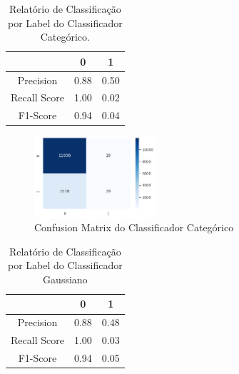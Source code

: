 \documentclass[conference]{IEEEtran}
\begin{document}
\begin{table}[H]

	\centering
    \caption{\label{tab:cr2-cnb} Relatório de Classificação por Label do Classificador Categórico.}
    \begin{small}
        \begin{tabular}{ccc}
        
            \hline
                                    & 0                & 1\\
            \hline
            Precision               & 0.88             & 0.50\\
            Recall Score            & 1.00             & 0.02\\
            F1-Score                & 0.94             & 0.04\\
            
            \hline
        \end{tabular}
    \end{small}
\end{table}

\begin{figure}[H]
    \centerline{\includegraphics[width=0.4\textwidth]{IMGS/cm-cnb-age-only.png}}
    
    \caption{\label{fig:cm2-cnb}Confusion Matrix do Classificador Categórico}
\end{figure}


\begin{table}[H]

	\centering
    \caption{\label{tab:cr2-gnb} Relatório de Classificação por Label do Classificador Gaussiano}
    \begin{small}
        \begin{tabular}{ccc}
        
            \hline
                                    & 0                & 1\\
            \hline
            Precision               & 0.88             & 0.48\\
            Recall Score            & 1.00             & 0.03\\
            F1-Score                & 0.94             & 0.05\\
            
            \hline
        \end{tabular}
    \end{small}

\end{table}
\end{document}
